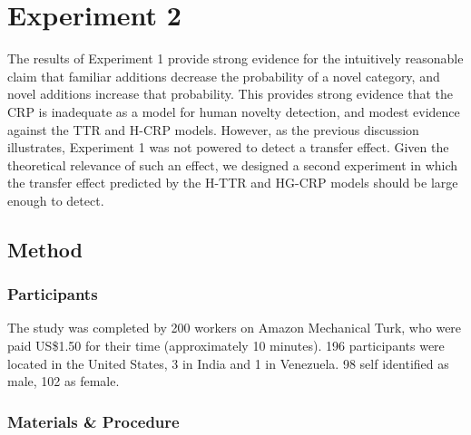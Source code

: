 \documentclass[doc]{apa6}
\begin{document}
\section{Experiment 2}

The results of Experiment 1 provide strong evidence for the intuitively reasonable claim that familiar additions decrease the probability of a novel category, and novel additions increase that probability. This provides strong evidence that the CRP is inadequate as a model for human novelty detection, and modest evidence against the TTR and H-CRP models. However, as the previous discussion illustrates, Experiment 1 was not powered to detect a transfer effect. Given the theoretical relevance of such an effect, we designed a second experiment in which the transfer effect predicted by the H-TTR and HG-CRP models should be large enough to detect.

\subsection{Method}

\subsubsection{Participants} The study was completed by 200 workers on Amazon Mechanical Turk, who were paid US\$1.50 for their time (approximately 10 minutes). 196 participants were located in the United States, 3 in India and 1 in Venezuela. 98 self identified as male, 102 as female.

\subsubsection{Materials \& Procedure}
\end{document}
